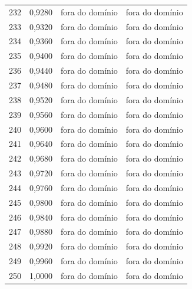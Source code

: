 \begin{tabular}{lrrr}
232 & 0,9280 & fora do domínio & fora do domínio \\
233 & 0,9320 & fora do domínio & fora do domínio \\
234 & 0,9360 & fora do domínio & fora do domínio \\
235 & 0,9400 & fora do domínio & fora do domínio \\
236 & 0,9440 & fora do domínio & fora do domínio \\
237 & 0,9480 & fora do domínio & fora do domínio \\
238 & 0,9520 & fora do domínio & fora do domínio \\
239 & 0,9560 & fora do domínio & fora do domínio \\
240 & 0,9600 & fora do domínio & fora do domínio \\
241 & 0,9640 & fora do domínio & fora do domínio \\
242 & 0,9680 & fora do domínio & fora do domínio \\
243 & 0,9720 & fora do domínio & fora do domínio \\
244 & 0,9760 & fora do domínio & fora do domínio \\
245 & 0,9800 & fora do domínio & fora do domínio \\
246 & 0,9840 & fora do domínio & fora do domínio \\
247 & 0,9880 & fora do domínio & fora do domínio \\
248 & 0,9920 & fora do domínio & fora do domínio \\
249 & 0,9960 & fora do domínio & fora do domínio \\
250 & 1,0000 & fora do domínio & fora do domínio \\
\bottomrule
\end{tabular}
